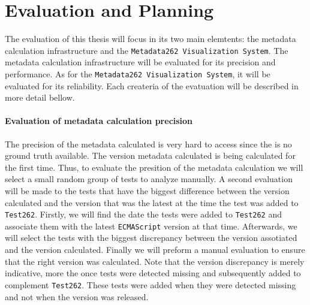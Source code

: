 \documentclass[runningheads]{llncs}
\begin{document}
\section{Evaluation and Planning}
\label{sec:Evaluation and Planning}





The evaluation of this thesis will focus in its two main elemtents: the metadata calculation infrastructure and the \texttt{Metadata262 Visualization System}. The metadata calculation infrastructure will be evaluated for its precision and performance. As for the \texttt{Metadata262 Visualization System}, it will be evaluated for its reliability. Each createria of the evatuation will be described in more detail bellow.

\paragraph{Evaluation of metadata calculation precision}
The precision of the metadata calculated is very hard to access since the is no ground truth available. The version metadata calculated is being calculated for the first time. Thus, to evaluate the presition of the metadata calculation we will select a small random group of tests to analyze manually. A second evaluation will be made to the tests that have the biggest difference between the version calculated and the version that was the latest at the time the test was added to \texttt{Test262}. Firstly, we will find the date the tests were added to \texttt{Test262} and associate them with the latest \texttt{ECMAScript} version at that time. Afterwards, we will select the tests with the biggest discrepancy between the version assotiated and the version calculated. Finally we will preform a manual evaluation to ensure that the right version was calculated. Note that the version discrepancy is merely indicative, more the once tests were detected missing and subsequently added to complement \texttt{Test262}. These tests were added when they were detected missing and not when the version was released.
\end{document}
